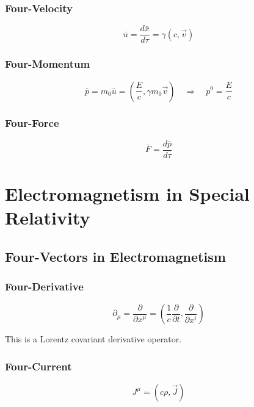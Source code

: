 \documentclass[11pt,a4paper]{article}
\begin{document}
\subsubsection{Four-Velocity}
\begin{equation}
\bar{u} = \frac{d\bar{x}}{d\tau} = \gamma(c, \vec{v})
\end{equation}

\subsubsection{Four-Momentum}
\begin{equation}
\bar{p} = m_0 \bar{u} = \left(\frac{E}{c}, \gamma m_0 \vec{v}\right) \quad \Rightarrow \quad p^0 = \frac{E}{c}
\end{equation}

\subsubsection{Four-Force}
\begin{equation}
\bar{F} = \frac{d\bar{p}}{d\tau}
\end{equation}

\section{Electromagnetism in Special Relativity}

\subsection{Four-Vectors in Electromagnetism}

\subsubsection{Four-Derivative}
\begin{equation}
\partial_\mu = \frac{\partial}{\partial x^\mu} = \left(\frac{1}{c}\frac{\partial}{\partial t}, \frac{\partial}{\partial x^i}\right)
\end{equation}

This is a Lorentz covariant derivative operator.

\subsubsection{Four-Current}
\begin{equation}
J^\mu = (c\rho, \vec{J})
\end{equation}
\end{document}
